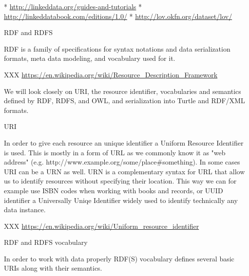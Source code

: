 \begitems
 * \url{http://linkeddata.org/guides-and-tutorials}
 * \url{http://linkeddatabook.com/editions/1.0/}
 * \url{http://lov.okfn.org/dataset/lov/}
\enditems

\sec RDF and RDFS

RDF is a family of specifications for syntax notations and data serialization
formats, meta data modeling, and vocabulary used for it. 

XXX \url{https://en.wikipedia.org/wiki/Resource_Description_Framework}

We will look closely on URI, the resource identifier, vocabularies and
semantics defined by RDF, RDFS, and OWL, and serialization into Turtle and
RDF/XML formats. 

\secc URI

In order to give each resource an unique identifier a Uniform Resource
Identifier is used. This is mostly in a form of URL as we commonly know it as
"web address" (e.g. http://www.example.org/some/place\#something). In some cases
URI can be a URN as well. URN is a complementary syntax for URL that allow us
to identify resources without specifying their location. This way we can for
example use ISBN codes when working with books and records, or UUID identifier
a Universally Uniqe Identifier widely used to identify technically any data
instance. 

XXX \url{https://en.wikipedia.org/wiki/Uniform_resource_identifier}

\secc RDF and RDFS vocabulary

In order to work with data properly RDF(S) vocabulary defines several basic
URIs along with their semantics. 


